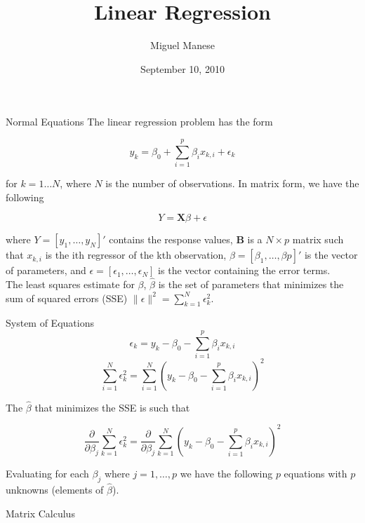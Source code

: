 \documentclass{article}
\title{Linear Regression}
\author{Miguel Manese}
\date{September 10, 2010}
\renewcommand{\vec}[1]{\mathbf{\mathit{#1}}}
\newcommand{\mat}[1]{\mathbf{#1}}
\begin{document}
\maketitle

\begin{section}{Normal Equations}
The linear regression problem has the form

\[ y_{k} = \beta_{0} + \sum_{i=1}^{p} \beta_{i} x_{k,i} + \epsilon_{k} \]

\noindent for $k = 1 \ldots N$, where $N$ is the number of observations. 
In matrix form, we have the following

\[ \vec{Y} = \mat{X}\vec{\beta} + \vec{\epsilon} \]

\noindent where $\vec{Y} = [y_{1}, \ldots, y_{N}]'$ contains the
response values, $\mat{B}$
is a $N \times p$ matrix such that $x_{k,i}$ is the ith regressor of the kth 
observation, $\vec{\beta} = [\beta_{1}, \ldots, \beta{p}]'$ is the vector
of parameters, and $\vec{\epsilon} = [\epsilon_{1}, \ldots, \epsilon_{N}]$
is the vector containing the error terms.\\

The least squares estimate for $\vec{\beta}$, $\hat{\vec{\beta}}$ is the set 
of parameters that minimizes the sum of squared errors (SSE)
$ \|\vec{\epsilon} \|^{2} = \sum_{k=1}^{N} \epsilon_{k}^{2} $.

\begin{subsection}{System of Equations}
\[ \epsilon_{k} = y_{k} - \beta_{0} - \sum_{i=1}^{p} \beta_{i} x_{k,i} \]
\[ \sum_{i=1}^{N} \epsilon_{k}^{2} = 
   \sum_{i=1}^{N} (y_{k} - \beta_{0} - \sum_{i=1}^{p} \beta_{i} x_{k,i})^2 \]

\noindent The $\hat{\vec{\beta}}$ that minimizes the SSE is such that

\[ \frac{\partial}{\partial \beta_{j}} \sum_{k=1}^{N} \epsilon_{k}^{2} =
   \frac{\partial}{\partial \beta_{j}} \sum_{k=1}^{N} (y_{k} - \beta_{0}
       - \sum_{i=1}^{p} \beta_{i} x_{k,i})^{2} \]

\noindent Evaluating for each $\beta_{j}$ where $j = 1, \ldots, p$ we have
the following $p$ equations with $p$ unknowns (elements of $\hat{\vec{\beta}}$).
\end{subsection}
\begin{subsection}{Matrix Calculus}
\end{subsection}
\end{section}
\end{document}
